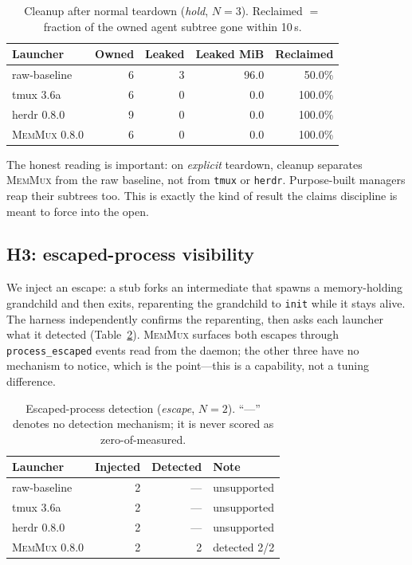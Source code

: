 \documentclass[11pt]{article}
\newcommand{\sys}{\textsc{MemMux}}
\newcommand{\code}[1]{\texttt{#1}}
\begin{document}
\begin{table}[t]
\centering\small
\begin{tabular}{@{}lrrrr@{}}
\toprule
Launcher & Owned & Leaked & Leaked MiB & Reclaimed \\
\midrule
raw-baseline & 6 & 3 & 96.0 & 50.0\% \\
tmux 3.6a    & 6 & 0 & 0.0  & 100.0\% \\
herdr 0.8.0  & 9 & 0 & 0.0  & 100.0\% \\
\sys{} 0.8.0 & 6 & 0 & 0.0  & 100.0\% \\
\bottomrule
\end{tabular}
\caption{Cleanup after normal teardown (\emph{hold}, $N{=}3$). Reclaimed $=$ fraction of the owned
agent subtree gone within 10\,s.}
\label{tab:h2}
\end{table}

The honest reading is important: on \emph{explicit} teardown, cleanup separates \sys{} from the raw
baseline, not from \code{tmux} or \code{herdr}. Purpose-built managers reap their subtrees too. This
is exactly the kind of result the claims discipline is meant to force into the open.

\subsection{H3: escaped-process visibility}

We inject an escape: a stub forks an intermediate that spawns a memory-holding grandchild and then
exits, reparenting the grandchild to \code{init} while it stays alive. The harness independently
confirms the reparenting, then asks each launcher what it detected (Table~\ref{tab:h3}). \sys{}
surfaces both escapes through \code{process\_escaped} events read from the daemon; the other three
have no mechanism to notice, which is the point---this is a capability, not a tuning difference.

\begin{table}[t]
\centering\small
\begin{tabular}{@{}lrrl@{}}
\toprule
Launcher & Injected & Detected & Note \\
\midrule
raw-baseline & 2 & --- & unsupported \\
tmux 3.6a    & 2 & --- & unsupported \\
herdr 0.8.0  & 2 & --- & unsupported \\
\sys{} 0.8.0 & 2 & 2   & detected 2/2 \\
\bottomrule
\end{tabular}
\caption{Escaped-process detection (\emph{escape}, $N{=}2$). ``---'' denotes no detection
mechanism; it is never scored as zero-of-measured.}
\label{tab:h3}
\end{table}
\end{document}
